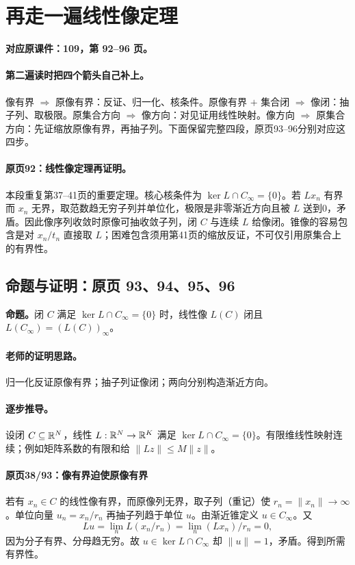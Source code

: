 \clearpage\section{再走一遍线性像定理}\label{g:109:92}

\textbf{对应原课件：109，第 92--96 页。}


\paragraph{第二遍读时把四个箭头自己补上。}
像有界 $\Rightarrow$ 原像有界：反证、归一化、核条件。原像有界 $+$ 集合闭 $\Rightarrow$ 像闭：抽子列、取极限。原集合方向 $\Rightarrow$ 像方向：对见证用线性映射。像方向 $\Rightarrow$ 原集合方向：先证缩放原像有界，再抽子列。下面保留完整四段，原页93--96分别对应这四步。


\paragraph{原页92：线性像定理再证明。}本段重复第37--41页的重要定理。核心核条件为 $\ker L\cap C_\infty=\{0\}$。若 $Lx_n$ 有界而 $x_n$ 无界，取范数趋无穷子列并单位化，极限是非零渐近方向且被 $L$ 送到0，矛盾。因此像序列收敛时原像可抽收敛子列，闭 $C$ 与连续 $L$ 给像闭。锥像的容易包含是对 $x_n/t_n$ 直接取 $L$；困难包含须用第41页的缩放反证，不可仅引用原集合上的有界性。



\subsection{命题与证明：原页 93、94、95、96}

\textbf{命题。}闭 $C$ 满足 $\ker L\cap C_\infty=\{0\}$ 时，线性像 $L(C)$ 闭且 $L(C_\infty)=(L(C))_\infty$。

\paragraph{老师的证明思路。}归一化反证原像有界；抽子列证像闭；两向分别构造渐近方向。

\paragraph{逐步推导。}
设闭 $C\subseteq\mathbb{R}^N$，线性 $L:\mathbb{R}^N\to\mathbb{R}^K$ 满足 $\ker L\cap C_\infty=\{0\}$。有限维线性映射连续；例如矩阵系数的有限和给 $\|Lz\|\le M\|z\|$。
\paragraph{原页38/93：像有界迫使原像有界}
若有 $x_n\in C$ 的线性像有界，而原像列无界，取子列（重记）使 $r_n=\|x_n\|\to\infty$。单位向量 $u_n=x_n/r_n$ 再抽子列趋于单位 $u$。由渐近锥定义 $u\in C_\infty$。又
\[Lu=\lim_n L(x_n/r_n)=\lim_n(Lx_n)/r_n=0,\]
因为分子有界、分母趋无穷。故 $u\in\ker L\cap C_\infty$ 却 $\|u\|=1$，矛盾。得到所需有界性。
